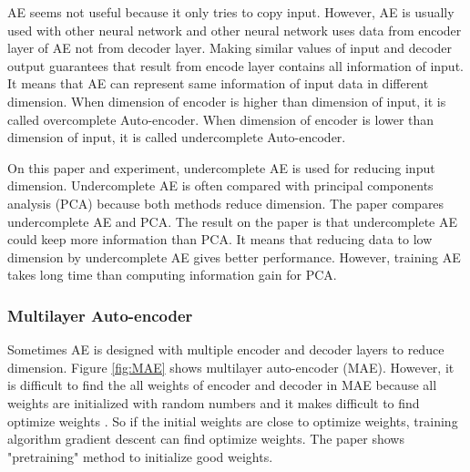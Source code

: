 \documentclass[draft,dvipsnames]{drexel-thesis}
\begin{document}
\begin{thesis}
AE seems not useful because it only tries to copy input. However, AE is usually used with other neural network and other neural network uses data from encoder layer of AE not from decoder layer. Making similar values of input and decoder output guarantees that result from encode layer contains all information of input. It means that AE can represent same information of input data in different dimension. When dimension of encoder is higher than dimension of input, it is called overcomplete Auto-encoder. When dimension of encoder is lower than dimension of input, it is called undercomplete Auto-encoder.

On this paper and experiment, undercomplete AE is used for reducing input dimension. Undercomplete AE is often compared with principal components analysis (PCA) because both methods reduce dimension. The paper \cite{hinton2006reducing} compares undercomplete AE and PCA. The result on the paper is that undercomplete AE could keep more information than PCA. It means that reducing data to low dimension by undercomplete AE gives better performance. However, training AE takes long time than computing information gain for PCA.



\subsubsection{Multilayer Auto-encoder}\label{subsubsec:MAE}
	Sometimes AE is designed with multiple encoder and decoder layers to reduce dimension. Figure \ref{fig:MAE} shows multilayer auto-encoder (MAE). However, it is difficult to find the all weights of encoder and decoder in MAE because all weights are initialized with random numbers and it makes difficult to find optimize weights \cite{zaremba2014recurrent}. So if the initial weights are close to optimize weights, training algorithm gradient descent can find optimize weights. The paper \cite{zaremba2014recurrent} shows "pretraining" method to initialize good weights.


\end{thesis}
\end{document}
